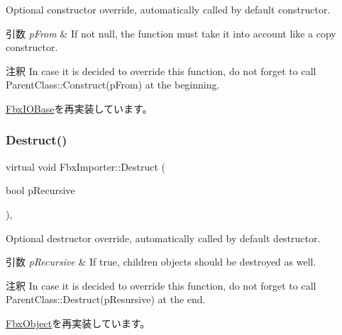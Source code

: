 Optional constructor override, automatically called by default constructor. 
\begin{DoxyParams}{引数}
{\em p\+From} & If not null, the function must take it into account like a copy constructor. \\
\hline
\end{DoxyParams}
\begin{DoxyRemark}{注釈}
In case it is decided to override this function, do not forget to call Parent\+Class\+::\+Construct(p\+From) at the beginning. 
\end{DoxyRemark}


\hyperlink{class_fbx_i_o_base_aed70ed1326f8fb1cc96e2086c73722f8}{Fbx\+I\+O\+Base}を再実装しています。

\mbox{\label{class_fbx_importer_a891b4689233ee23cc00061c18c9f8e99}} 
\subsubsection{\texorpdfstring{Destruct()}{Destruct()}}
{\footnotesize\ttfamily virtual void Fbx\+Importer\+::\+Destruct (\begin{DoxyParamCaption}\item[{bool}]{p\+Recursive }\end{DoxyParamCaption})\hspace{0.3cm}{\ttfamily [protected]}, {\ttfamily [virtual]}}

Optional destructor override, automatically called by default destructor. 
\begin{DoxyParams}{引数}
{\em p\+Recursive} & If true, children objects should be destroyed as well. \\
\hline
\end{DoxyParams}
\begin{DoxyRemark}{注釈}
In case it is decided to override this function, do not forget to call Parent\+Class\+::\+Destruct(p\+Resursive) at the end. 
\end{DoxyRemark}


\hyperlink{class_fbx_object_a123e084d9b32b29c28af6384b7c3c608}{Fbx\+Object}を再実装しています。

\mbox{\label{class_fbx_importer_ad3bdeef0246ffd257676b60d8c0f3b3c}} 
